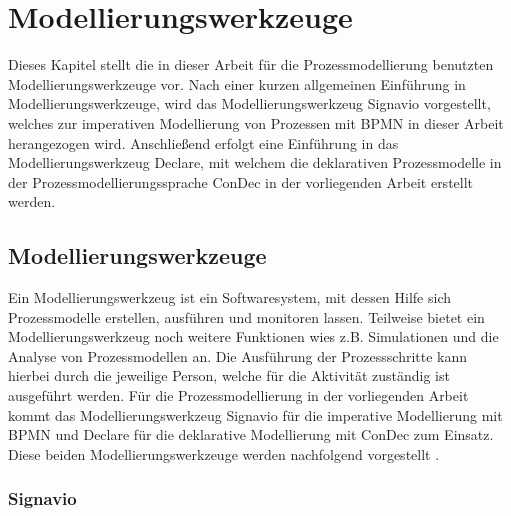 \chapter{Modellierungswerkzeuge}\label{sec:chapter4}
Dieses Kapitel stellt die in dieser Arbeit für die Prozessmodellierung benutzten Modellierungswerkzeuge vor. Nach einer kurzen allgemeinen Einführung in Modellierungswerkzeuge, wird das Modellierungswerkzeug Signavio vorgestellt, welches zur imperativen Modellierung von Prozessen mit BPMN in dieser Arbeit herangezogen wird. Anschließend erfolgt eine Einführung in das Modellierungswerkzeug Declare, mit welchem die deklarativen Prozessmodelle in der Prozessmodellierungssprache ConDec in der vorliegenden Arbeit erstellt werden. 

\section{Modellierungswerkzeuge}\label{sec:chapter4:Modellierungswerkzeuge}
Ein Modellierungswerkzeug ist ein Softwaresystem, mit dessen Hilfe sich Prozessmodelle erstellen, ausführen und monitoren lassen. Teilweise bietet ein Modellierungswerkzeug noch weitere Funktionen wies z.B. Simulationen und die Analyse von Prozessmodellen an. Die Ausführung der Prozessschritte kann hierbei durch die jeweilige Person, welche für die Aktivität zuständig ist ausgeführt werden. Für die Prozessmodellierung in der vorliegenden Arbeit kommt das Modellierungswerkzeug Signavio für die imperative Modellierung mit BPMN und Declare für die deklarative Modellierung mit ConDec zum Einsatz. Diese beiden Modellierungswerkzeuge werden nachfolgend vorgestellt \cite{gadatsch2012}.

\subsection{Signavio}

